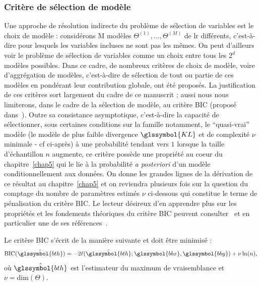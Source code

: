 \subsubsection{Critère de sélection de modèle} \label{subsubsec:choix_modele}

Une approche de résolution indirecte du problème de sélection de variables est le choix de modèle : considérons M modèles $\Theta^{(1)},\dots,\Theta^{(M)}$ de \gls{lr} différents, c'est-à-dire pour lesquels les variables incluses ne sont pas les mêmes. On peut d'ailleurs voir le problème de sélection de variables comme un choix entre tous les $2^d$ modèles possibles. Dans ce cadre, de nombreux critères de choix de modèle, voire d'aggrégation de modèles, c'est-à-dire de sélection de tout ou partie de ces modèles en pondérant leur contribution globale, ont été proposés. La justification de ces critères sort largement du cadre de ce manuscrit ; aussi nous nous limiterons, dans le cadre de la sélection de modèle, au critère BIC (proposé dans~\cite{BIC}). Outre sa consistance asymptotique, c'est-à-dire la capacité de sélectionner, sous certaines conditions sur la famille notamment, le ``quasi-vrai'' modèle (le modèle de plus faible divergence $\glssymbol{KL}$ et de complexité $\nu$ minimale - cf ci-après) à une probabilité tendant vers $1$ lorsque la taille d'échantillon $n$ augmente, ce critère possède une propriété au coeur du chapitre~\ref{chap5} qui le lie à la probabilité \textit{a posteriori} d'un modèle conditionnellement aux données. On donne les grandes lignes de la dérivation de ce résultat au chapitre~\ref{chap5} et on reviendra plusieurs fois sur la question du comptage du nombre de paramètres estimés $\nu$ ci-dessous qui constitue le terme de pénalisation du critère BIC. Le lecteur désireux d'en apprendre plus sur les propriétés et les fondements théoriques du critère BIC peuvent consulter~\cite{lebarbier} et en particulier une de ses références~\cite{burnham2003model}.

Le critère BIC s'écrit de la manière suivante et doit être minimisé :
\begin{equation}
    \label{eq:BIC}
    \text{BIC}(\hat{\glssymbol{bth}}) =  -2 \ell(\hat{\glssymbol{bth}} ; \glssymbol{bbx},\glssymbol{bby}) + \nu \ln (n),
\end{equation}
où $\hat{\glssymbol{bth}}$ est l'estimateur du maximum de vraisemblance et $\nu = \text{dim}(\Theta)$.


